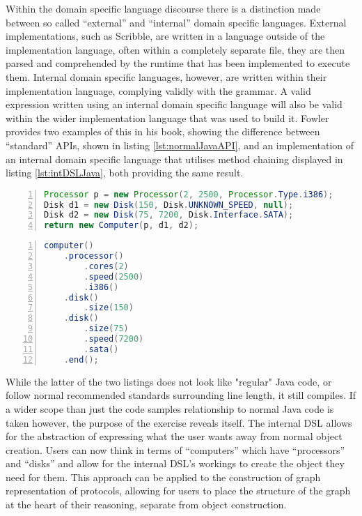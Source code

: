 \documentclass{article}
\begin{document}
	Within the domain specific language discourse there is a distinction made between so called ``external'' and ``internal'' domain specific languages\cite{Fowler:2010:DSL:1809745}. External implementations, such as Scribble, are written in a language outside of the implementation language, often within a completely separate file, they are then parsed and comprehended by the runtime that has been implemented to execute them. Internal domain specific languages, however, are written within their implementation language, complying validly with the grammar. A valid expression written using an internal domain specific language will also be valid within the wider implementation language that was used to build it. Fowler provides two examples of this in his book, showing the difference between ``standard'' APIs, shown in listing \ref{lst:normalJavaAPI}, and an implementation of an internal domain specific language that utilises method chaining displayed in listing \ref{lst:intDSLJava}, both providing the same result.
	
	\begin{lstlisting}[label={lst:normalJavaAPI}, language=java, frame=single, numbers=left, caption=Object construction in a normal API\cite{Fowler:2010:DSL:1809745}]
Processor p = new Processor(2, 2500, Processor.Type.i386);
Disk d1 = new Disk(150, Disk.UNKNOWN_SPEED, null);
Disk d2 = new Disk(75, 7200, Disk.Interface.SATA);
return new Computer(p, d1, d2);

	\end{lstlisting}
	
\begin{lstlisting}[label={lst:intDSLJava}, language=java, frame=single, numbers=left, caption=Object construction in a method chained internal Domain Specific Language\cite{Fowler:2010:DSL:1809745}]
computer()
	.processor()
		.cores(2)
		.speed(2500)
		.i386()
	.disk()
		.size(150)
	.disk()
		.size(75)
		.speed(7200)
		.sata()
	.end();

	\end{lstlisting}
	While the latter of the two listings does not look like "regular" Java code, or follow normal recommended standards surrounding line length, it still compiles. If a wider scope than just the code samples relationship to normal Java code is taken however, the purpose of the exercise reveals itself. The internal DSL allows for the abstraction of expressing what the user wants away from normal object creation. Users can now think in terms of ``computers'' which have ``processors'' and ``disks'' and allow for the internal DSL's workings to create the object they need for them. This approach can be applied to the construction of graph representation of protocols, allowing for users to place the structure of the graph at the heart of their reasoning, separate from object construction.
	
\end{document}
